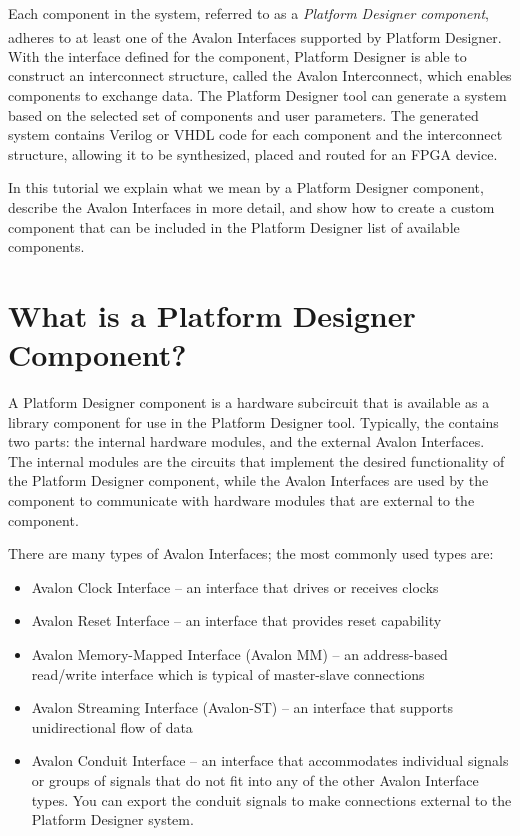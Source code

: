 \documentclass[11pt, twoside, pdftex]{article}
\begin{document}
Each component in the system, referred to as a {\it Platform Designer component}, adheres to at least 
one of the Avalon\textsuperscript{\textregistered} Interfaces supported by Platform Designer.  With the interface defined for the 
component, Platform Designer is able to construct an interconnect structure, called the Avalon Interconnect,
which enables components to exchange data. The Platform Designer tool can generate a system based on the 
selected set of components and user parameters. The generated system contains Verilog or 
VHDL code for each component and the interconnect structure, allowing it to be synthesized, 
placed and routed for an FPGA device.

In this tutorial we explain what we mean by a Platform Designer component, describe the Avalon Interfaces 
in more detail, and show how to create a custom component that can be included in the Platform Designer 
list of available components.

\section{What is a Platform Designer Component?}

A Platform Designer component is a hardware subcircuit that is available as a library component for use
in the Platform Designer tool.  Typically, the contains two parts: the internal hardware 
modules, and the external Avalon Interfaces.  The internal modules are the circuits that 
implement the desired functionality of the Platform Designer component, while the Avalon Interfaces are 
used by the component to communicate with hardware modules that are external to the component.

There are many types of Avalon Interfaces; the most commonly used types are: 
\begin {itemize}
\item Avalon Clock Interface -- an interface that drives or receives clocks
\item Avalon Reset Interface -- an interface that provides reset capability
\item Avalon Memory-Mapped Interface (Avalon MM) -- an address-based read/write interface 
which is typical of master-slave connections
\item Avalon Streaming Interface (Avalon-ST) -- an interface that supports unidirectional 
flow of data
\item Avalon Conduit Interface -- an interface that accommodates individual signals or groups 
of signals that do not fit into any of the other Avalon Interface types. You can export 
the conduit signals to make connections external to the Platform Designer system.
\end{itemize}
\end{document}
